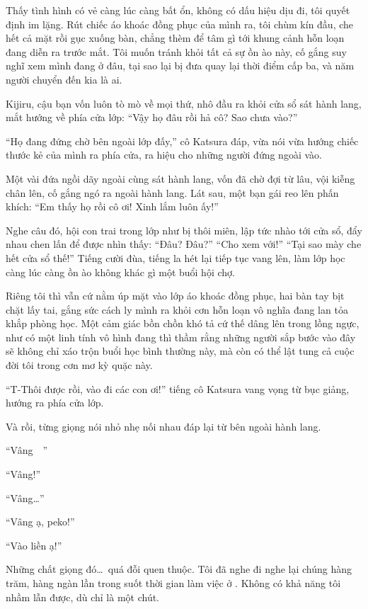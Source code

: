 \documentclass[../main.tex]{subfiles}
\begin{document}
Thấy tình hình có vẻ càng lúc càng bất ổn, không có dấu hiệu dịu đi, tôi quyết định im lặng. Rút chiếc áo khoác đồng phục của mình ra, tôi chùm kín đầu, che hết cả mặt rồi gục xuống bàn, chẳng thèm để tâm gì tới khung cảnh hỗn loạn đang diễn ra trước mắt. Tôi muốn tránh khỏi tất cả sự ồn ào này, cố gắng suy nghĩ xem mình đang ở đâu, tại sao lại bị đưa quay lại thời điểm cấp ba, và năm người chuyển đến kia là ai.

Kijiru, cậu bạn vốn luôn tò mò về mọi thứ, nhô đầu ra khỏi cửa sổ sát hành lang, mắt hướng về phía cửa lớp: ``Vậy họ đâu rồi hả cô? Sao chưa vào?''

``Họ đang đứng chờ bên ngoài lớp đấy,'' cô Katsura đáp, vừa nói vừa hướng chiếc thước kẻ của mình ra phía cửa, ra hiệu cho những người đứng ngoài vào.

Một vài đứa ngồi dãy ngoài cùng sát hành lang, vốn đã chờ đợi từ lâu, vội kiễng chân lên, cố gắng ngó ra ngoài hành lang. Lát sau, một bạn gái reo lên phấn khích: ``Em thấy họ rồi cô ơi! Xinh lắm luôn ấy!''

Nghe câu đó, hội con trai trong lớp như bị thôi miên, lập tức nhào tới cửa sổ, đẩy nhau chen lấn để được nhìn thấy: ``Đâu? Đâu?'' ``Cho xem với!'' ``Tại sao mày che hết cửa sổ thế!'' Tiếng cười đùa, tiếng la hét lại tiếp tục vang lên, làm lớp học càng lúc càng ồn ào không khác gì một buổi hội chợ.

Riêng tôi thì vẫn cứ nằm úp mặt vào lớp áo khoác đồng phục, hai bàn tay bịt chặt lấy tai, gắng sức cách ly mình ra khỏi cơn hỗn loạn vô nghĩa đang lan tỏa khắp phòng học. Một cảm giác bồn chồn khó tả cứ thế dâng lên trong lồng ngực, như có một linh tính vô hình đang thì thầm rằng những người sắp bước vào đây sẽ không chỉ xáo trộn buổi học bình thường này, mà còn có thể lật tung cả cuộc đời tôi trong cơn mơ kỳ quặc này.

``T-Thôi được rồi, vào đi các con ơi!'' tiếng cô Katsura vang vọng từ bục giảng, hướng ra phía cửa lớp.

Và rồi, từng giọng nói nhỏ nhẹ nối nhau đáp lại từ bên ngoài hành lang.

``Vâng~~''

``Vâng!''

``Vâng\dots''

``Vâng ạ, peko!''

``Vào liền ạ!''

Những chất giọng đó\dots\ quá đỗi quen thuộc. Tôi đã nghe đi nghe lại chúng hàng trăm, hàng ngàn lần trong suốt thời gian làm việc ở \hll. Không có khả năng tôi nhầm lẫn được, dù chỉ là một chút.
\end{document}
